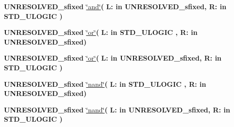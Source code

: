 \begin{DoxyCompactItemize}
\item 
{\bfseries {\bfseries \textcolor{vhdlchar}{U\+N\+R\+E\+S\+O\+L\+V\+E\+D\+\_\+sfixed}\textcolor{vhdlchar}{ }}} \hyperlink{class__fixed__pkg_a0033f7130cf6aa9248718b3eb3a675e5}{\char`\"{}and\char`\"{}}{\bfseries  ( }{\bfseries \textcolor{vhdlchar}{L\+: }\textcolor{stringliteral}{in }\textcolor{vhdlchar}{U\+N\+R\+E\+S\+O\+L\+V\+E\+D\+\_\+sfixed}}{\bfseries  , \textcolor{vhdlchar}{R\+: }\textcolor{stringliteral}{in }{\bfseries \textcolor{comment}{S\+T\+D\+\_\+\+U\+L\+O\+G\+I\+C}\textcolor{vhdlchar}{ }}}{\bfseries  )} 
\item 
{\bfseries {\bfseries \textcolor{vhdlchar}{U\+N\+R\+E\+S\+O\+L\+V\+E\+D\+\_\+sfixed}\textcolor{vhdlchar}{ }}} \hyperlink{class__fixed__pkg_a93589b14f4e54ca216eb6f0c400242d1}{\char`\"{}or\char`\"{}}{\bfseries  ( }{\bfseries \textcolor{vhdlchar}{L\+: }\textcolor{stringliteral}{in }{\bfseries \textcolor{comment}{S\+T\+D\+\_\+\+U\+L\+O\+G\+I\+C}\textcolor{vhdlchar}{ }}}{\bfseries  , \textcolor{vhdlchar}{R\+: }\textcolor{stringliteral}{in }\textcolor{vhdlchar}{U\+N\+R\+E\+S\+O\+L\+V\+E\+D\+\_\+sfixed}}{\bfseries  )} 
\item 
{\bfseries {\bfseries \textcolor{vhdlchar}{U\+N\+R\+E\+S\+O\+L\+V\+E\+D\+\_\+sfixed}\textcolor{vhdlchar}{ }}} \hyperlink{class__fixed__pkg_a93589b14f4e54ca216eb6f0c400242d1}{\char`\"{}or\char`\"{}}{\bfseries  ( }{\bfseries \textcolor{vhdlchar}{L\+: }\textcolor{stringliteral}{in }\textcolor{vhdlchar}{U\+N\+R\+E\+S\+O\+L\+V\+E\+D\+\_\+sfixed}}{\bfseries  , \textcolor{vhdlchar}{R\+: }\textcolor{stringliteral}{in }{\bfseries \textcolor{comment}{S\+T\+D\+\_\+\+U\+L\+O\+G\+I\+C}\textcolor{vhdlchar}{ }}}{\bfseries  )} 
\item 
{\bfseries {\bfseries \textcolor{vhdlchar}{U\+N\+R\+E\+S\+O\+L\+V\+E\+D\+\_\+sfixed}\textcolor{vhdlchar}{ }}} \hyperlink{class__fixed__pkg_a3fd15b1b6d11f10d71b4c7cc4e7e67d5}{\char`\"{}nand\char`\"{}}{\bfseries  ( }{\bfseries \textcolor{vhdlchar}{L\+: }\textcolor{stringliteral}{in }{\bfseries \textcolor{comment}{S\+T\+D\+\_\+\+U\+L\+O\+G\+I\+C}\textcolor{vhdlchar}{ }}}{\bfseries  , \textcolor{vhdlchar}{R\+: }\textcolor{stringliteral}{in }\textcolor{vhdlchar}{U\+N\+R\+E\+S\+O\+L\+V\+E\+D\+\_\+sfixed}}{\bfseries  )} 
\item 
{\bfseries {\bfseries \textcolor{vhdlchar}{U\+N\+R\+E\+S\+O\+L\+V\+E\+D\+\_\+sfixed}\textcolor{vhdlchar}{ }}} \hyperlink{class__fixed__pkg_a3fd15b1b6d11f10d71b4c7cc4e7e67d5}{\char`\"{}nand\char`\"{}}{\bfseries  ( }{\bfseries \textcolor{vhdlchar}{L\+: }\textcolor{stringliteral}{in }\textcolor{vhdlchar}{U\+N\+R\+E\+S\+O\+L\+V\+E\+D\+\_\+sfixed}}{\bfseries  , \textcolor{vhdlchar}{R\+: }\textcolor{stringliteral}{in }{\bfseries \textcolor{comment}{S\+T\+D\+\_\+\+U\+L\+O\+G\+I\+C}\textcolor{vhdlchar}{ }}}{\bfseries  )} 

\end{DoxyCompactItemize}
